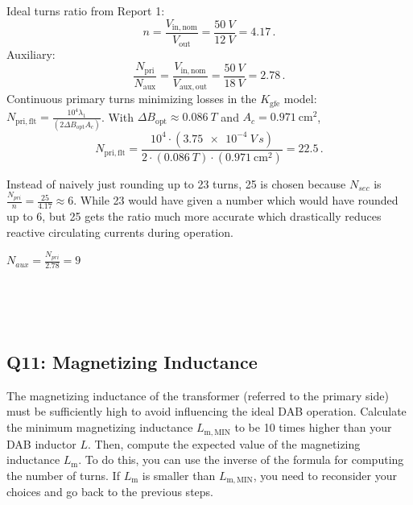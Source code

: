 \documentclass{PELsmallreport}
\begin{document}
\begin{framed}
	\vspace{2em}
	Ideal turns ratio from Report 1:
\begin{equation}
  n=\frac{V_{\mathrm{in,nom}}}{V_{\mathrm{out}}}=\frac{\SI{50}{V}}{\SI{12}{V}}=\num{4.17}\,.
\end{equation}
Auxiliary:
\begin{equation}
  \frac{N_{\mathrm{pri}}}{N_{\mathrm{aux}}}=\frac{V_{\mathrm{in,nom}}}{V_{\mathrm{aux,out}}}
  =\frac{\SI{50}{V}}{\SI{18}{V}}=\num{2.78}\,.
\end{equation}
Continuous primary turns minimizing losses in the $K_{\mathrm{gfe}}$ model: $N_{\mathrm{pri,flt}}=\frac{10^4\lambda_1}{(2\Delta B_{\mathrm{opt}}A_c)}$. With $\Delta B_{\mathrm{opt}}\approx\SI{0.086}{T}$ and $A_c=\SI{0.971}{\cm\squared}$,
\begin{equation}
  N_{\mathrm{pri,flt}}=\frac{10^4\cdot(\SI{3.75e-4}{V\,s})}{2\cdot(\SI{0.086}{T})\cdot(\SI{0.971}{\cm\squared})}=\num{22.5}\,.
\end{equation}

Instead of naively just rounding up to 23 turns, 25 is chosen because \(N_{sec}\) is \(\frac{N_{pri}}{n} = \frac{25}{4.17} \approx 6\). While 23 would have given a number which would have rounded up to 6, but 25 gets the ratio much more accurate which drastically reduces 
 reactive circulating currents during operation.

 \(N_{aux} = \frac{N_{pri}}{2.78} = 9\) 

	\vspace{2em}
\end{framed}

 \qquad {}  \\
 \qquad {} \qquad {}  \qquad  \hfill {} 
\\
 \qquad {}  \\


\subsection{Q11: Magnetizing Inductance} 
The magnetizing inductance of the transformer (referred to the primary side) must be sufficiently high to avoid influencing the ideal DAB operation. 
Calculate the minimum magnetizing inductance $L_\mathrm{m,MIN}$ to be 10 times higher than your DAB inductor $L$.
Then, compute the expected value of the magnetizing inductance $L_\mathrm{m}$. 
To do this, you can use the inverse of the formula for computing  the number of turns. 
If $L_\mathrm{m}$ is smaller than $L_\mathrm{m,MIN}$, you need to reconsider your choices and go back to the previous steps. 
\end{document}

